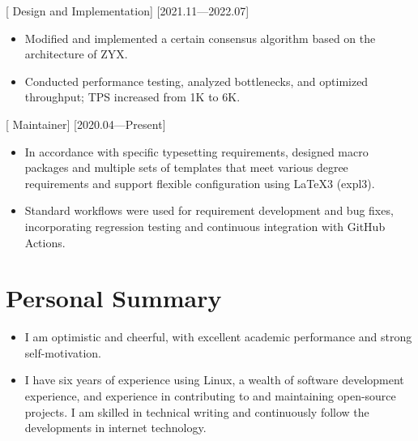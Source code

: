 \documentclass{resume}
\begin{document}
[ Design and Implementation]
[2021.11—2022.07] 

\begin{itemize}
  \item Modified and implemented a certain consensus algorithm based on the architecture of ZYX.
  \item Conducted performance testing, analyzed bottlenecks, and optimized throughput; TPS increased from 1K to 6K.
\end{itemize}

[ Maintainer]
[2020.04—Present]

\begin{itemize}
  \item In accordance with specific typesetting requirements, designed macro packages and multiple sets of templates that meet various degree requirements and support flexible configuration using LaTeX3 (expl3).
  \item Standard workflows were used for requirement development and bug fixes, incorporating regression testing and continuous integration with GitHub Actions.
\end{itemize}

\section*{Personal Summary}

\begin{itemize}
\item I am optimistic and cheerful, with excellent academic performance and strong self-motivation.
\item I have six years of experience using Linux, a wealth of software development experience, and experience in contributing to and maintaining open-source projects. I am skilled in technical writing and continuously follow the developments in internet technology.
\end{itemize}
\end{document}
